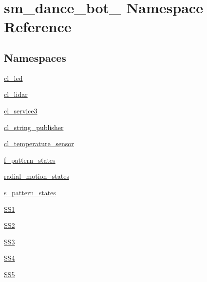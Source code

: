 \hypertarget{namespacesm__dance__bot__2}{}\section{sm\+\_\+dance\+\_\+bot\+\_ Namespace Reference}
\label{namespacesm__dance__bot__2}
\subsection*{Namespaces}
\begin{DoxyCompactItemize}
\item 
 \hyperlink{namespacesm__dance__bot__2_1_1cl__led}{cl\+\_\+led}
\item 
 \hyperlink{namespacesm__dance__bot__2_1_1cl__lidar}{cl\+\_\+lidar}
\item 
 \hyperlink{namespacesm__dance__bot__2_1_1cl__service3}{cl\+\_\+service3}
\item 
 \hyperlink{namespacesm__dance__bot__2_1_1cl__string__publisher}{cl\+\_\+string\+\_\+publisher}
\item 
 \hyperlink{namespacesm__dance__bot__2_1_1cl__temperature__sensor}{cl\+\_\+temperature\+\_\+sensor}
\item 
 \hyperlink{namespacesm__dance__bot__2_1_1f__pattern__states}{f\+\_\+pattern\+\_\+states}
\item 
 \hyperlink{namespacesm__dance__bot__2_1_1radial__motion__states}{radial\+\_\+motion\+\_\+states}
\item 
 \hyperlink{namespacesm__dance__bot__2_1_1s__pattern__states}{s\+\_\+pattern\+\_\+states}
\item 
 \hyperlink{namespacesm__dance__bot__2_1_1SS1}{S\+S1}
\item 
 \hyperlink{namespacesm__dance__bot__2_1_1SS2}{S\+S2}
\item 
 \hyperlink{namespacesm__dance__bot__2_1_1SS3}{S\+S3}
\item 
 \hyperlink{namespacesm__dance__bot__2_1_1SS4}{S\+S4}
\item 
 \hyperlink{namespacesm__dance__bot__2_1_1SS5}{S\+S5}
\end{DoxyCompactItemize}
